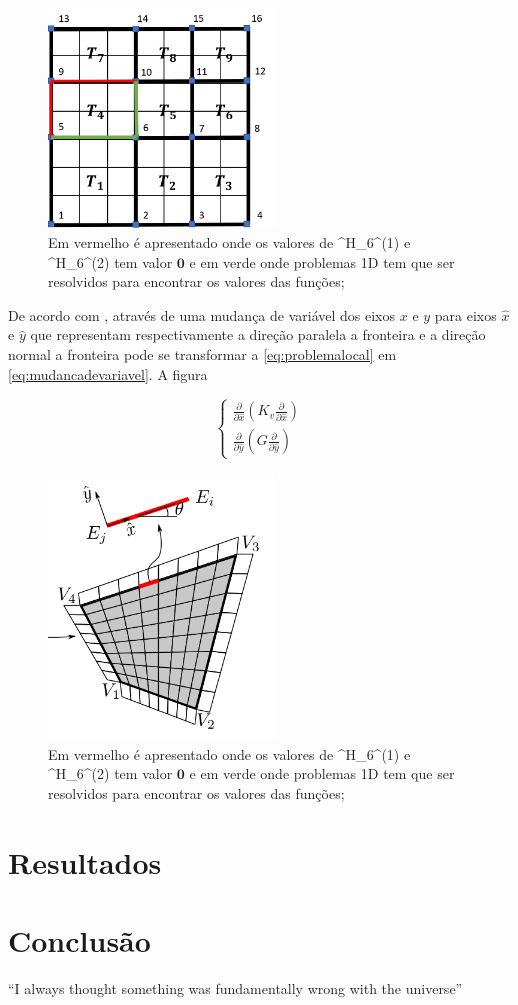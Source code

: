 \documentclass{article}
\begin{document}
 


\begin{figure}[!htbp]
\label{fig:phi6_values}
\centering
\includegraphics[width=6cm]{figs/phi6_values.png}
\caption{Em vermelho é apresentado onde os valores de \phi^H_{6^{(1)}} e \phi^H_{6^{(2)}} tem valor $\mathbf{0}$ e em verde onde problemas 1D tem que ser resolvidos para encontrar os valores das funções;}
\end{figure}

De acordo com \cite{casteletto}, através de uma mudança de variável dos eixos $x$ e $y$ para eixos $\hat{x}$ e $\hat{y}$ que representam respectivamente a direção  paralela a fronteira e a direção normal a fronteira pode se transformar a \ref{eq:problemalocal} em \ref{eq:mudancadevariavel}.  A figura 


\begin{equation} 
    \left\{\begin{matrix} \label{eq:mudancadevariavel}
\frac{\partial}{\partial \hat{x}}(K_v \frac{\partial}{\partial \hat{x}})
\\ 
\frac{\partial}{\partial \hat{y}}(G \frac{\partial}{\partial \hat{y}})
\end{matrix}\right.
\end{equation}

\begin{figure}[!htbp]
\label{fig:mudancadevariavel}
\centering
\includegraphics[width=6cm]{figs/mudancadevariavel.png}
\caption{Em vermelho é apresentado onde os valores de \phi^H_{6^{(1)}} e \phi^H_{6^{(2)}} tem valor $\mathbf{0}$ e em verde onde problemas 1D tem que ser resolvidos para encontrar os valores das funções;}
\end{figure}

\section{Resultados}


\section{Conclusão}
``I always thought something was fundamentally wrong with the universe'' \citep{adams1995hitchhiker}



\end{document}
